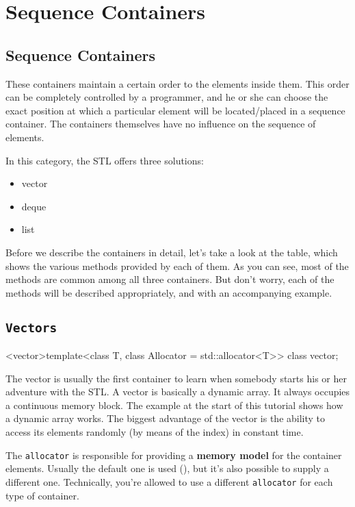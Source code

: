 %
%
\section{Sequence Containers} %
\subsection{Sequence Containers} %
These containers maintain a certain order to the elements inside them. This order can be completely 
controlled by a programmer, and he or she can choose the exact position at which a particular element 
will be located/placed in a sequence container. The containers themselves have no influence on the 
sequence of elements.

In this category, the STL offers three solutions:
\begin{itemize}
    \item vector
    \item deque
    \item list
\end{itemize}
Before we describe the containers in detail, let’s take a look at the table, which shows the various 
methods provided by each of them. As you can see, most of the methods are common among all three containers. 
But don’t worry, each of the methods will be described appropriately, and with an accompanying example.

\subsection{\texttt{Vectors}} %
\begin{classinfo}
  {<vector>}{template<class T, class Allocator = std::allocator<T>> class vector;}
\end{classinfo}
The vector is usually the first container to learn when somebody starts his or her adventure with the STL. 
A vector is basically a dynamic array. It always occupies a continuous memory block. The example at 
the start of this tutorial shows how a dynamic array works. The biggest advantage of the vector is 
the ability to access its elements randomly (by means of the index) in constant time.

The \texttt{allocator} is responsible for providing a \textbf{memory model} for the container elements. 
Usually the default one is used (), but it’s also possible to supply 
a different one. Technically, you’re allowed to use a different \texttt{allocator} for each type of container.


